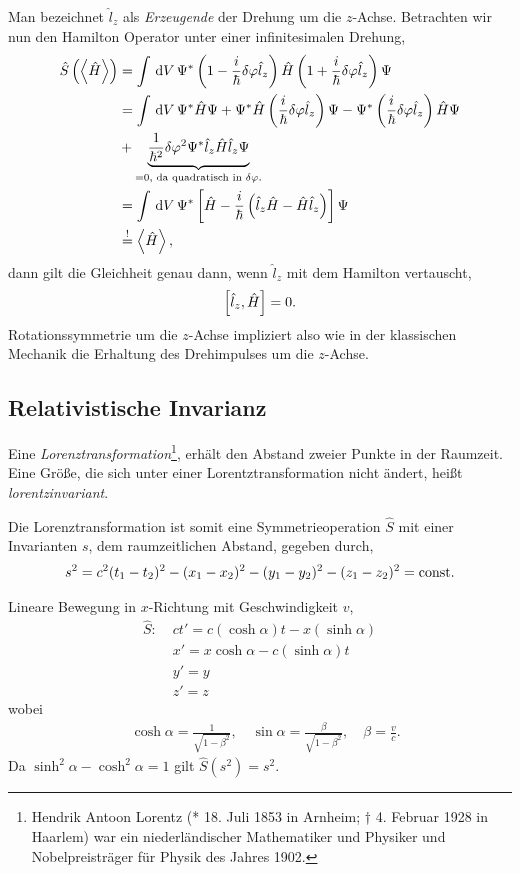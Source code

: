 \begin{bspn}
Man bezeichnet $\hat{l}_z$ als \emph{Erzeugende} der Drehung um
die $z$-Achse. Betrachten wir nun den Hamilton Operator unter einer infinitesimalen
Drehung,
\begin{align*}
\hat{S}\left(\left\langle\hat{H}\right\rangle\right)
&= \int\,\mathrm{d} V\, \Psi^*\left(1-\frac{i}{\hbar}\delta\varphi \hat{\boldmath{l}}_z\right)\hat{H}
\left(1+\frac{i}{\hbar}\delta\varphi \hat{\boldmath{l}}_z\right)\Psi\\
&= \int\,\mathrm{d} V\, \Psi^*\hat{H}\Psi +
\Psi^*\hat{H}\left(\frac{i}{\hbar}\delta\varphi \hat{\boldmath{l}}_z\right)\Psi
- \Psi^*\left(\frac{i}{\hbar}\delta\varphi \hat{\boldmath{l}}_z\right)\hat{H}\Psi \\
&+\underbrace{\frac{1}{\hbar^2}\delta\varphi^2\Psi^*\hat{\boldmath{l}}_z\hat{H}\hat{\boldmath{l}}_z\Psi}_{ 
= 0, \text{ da quadratisch in $\delta\varphi$}.}\\
&= \int\,\mathrm{d} V\, \Psi^*\left[\hat{H} - \frac{i}{\hbar}\left(\hat{\boldmath{l}}_z\hat{H} -
\hat{H}\hat{\boldmath{l}}_z\right)\right]\Psi\\ &\overset{!}{=} \left\langle\hat{H}\right\rangle,
\end{align*}
dann gilt die Gleichheit genau dann, wenn $\hat{l}_z$ mit dem Hamilton
vertauscht,
\begin{align*}
\left[\hat{l}_z,\hat{H}\right] = 0.
\end{align*}
Rotationssymmetrie um die $z$-Achse impliziert also wie in der klassischen
Mechanik die Erhaltung des Drehimpulses um die $z$-Achse.\bsphere
\end{bspn}

\subsection{Relativistische Invarianz}

Eine \emph{Lorenztransformation}\footnote{Hendrik Antoon Lorentz (* 18. Juli
1853 in Arnheim; † 4. Februar 1928 in Haarlem) war ein niederländischer
Mathematiker und Physiker und Nobelpreisträger für Physik des Jahres 1902.}, 
erhält den Abstand zweier Punkte in der Raumzeit. Eine Größe, die sich unter
einer Lorentztransformation nicht ändert, heißt \emph{lorentzinvariant}.

Die Lorenztransformation ist somit eine Symmetrieoperation $\hat{S}$ mit einer
Invarianten $s$, dem raumzeitlichen Abstand, gegeben durch,
\begin{align*}
s^2 = c^2(t_1-t_2)^2 - (x_1-x_2)^2 - (y_1-y_2)^2 - (z_1-z_2)^2 = \mathrm{const}.
\end{align*}
\begin{bspn}
Lineare Bewegung in $x$-Richtung mit Geschwindigkeit $v$,
\begin{align*}
\hat{S}:\; & ct' = c(\cosh \alpha)t - x(\sinh\alpha)\\
& x' = x\cosh \alpha - c(\sinh \alpha)t\\
& y' = y\\
& z' = z
\end{align*}
wobei
\begin{align*}
&\cosh \alpha = \frac{1}{\sqrt{1-\beta^2}},\quad
\sin\alpha = \frac{\beta}{\sqrt{1-\beta^2}},\quad
 \beta=\frac{v}{c}.
\end{align*}
Da $\sinh^2 \alpha - \cosh^2 \alpha = 1$ gilt $\hat{S}(s^2)=s^2$.\bsphere
\end{bspn}

